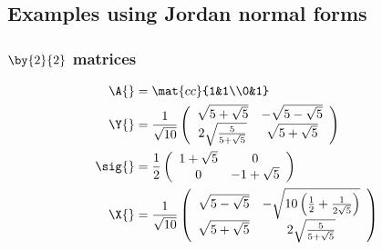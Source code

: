 \subsection[Jordan normal forms]{Examples using Jordan normal forms}

\subsubsection{$\by{2}{2}$ matrices}
\begin{equation}
  \begin{split}
  \A{} &= \mat{cc}{1&1\\0&1}\\
    \Y{} &= \frac{1}{\sqrt{10}}
    \left(
\begin{array}{cc}
 \sqrt{5+\sqrt{5}} & -\sqrt{5-\sqrt{5}} \\
 2 \sqrt{\frac{5}{5+\sqrt{5}}} & \sqrt{5+\sqrt{5}}
\end{array}
\right)\\
    \sig{}&=\frac{1}{2}
    \left(
\begin{array}{cc}
 1+\sqrt{5} & 0 \\
 0 & -1+\sqrt{5}
\end{array}
\right)\\
    \X{} &= \frac{1}{\sqrt{10}}
    \left(
\begin{array}{cc}
 \sqrt{5-\sqrt{5}} & -\sqrt{10 \left(\frac{1}{2}+\frac{1}{2 \sqrt{5}}\right)} \\
 \sqrt{5+\sqrt{5}} & 2 \sqrt{\frac{5}{5+\sqrt{5}}}
\end{array}
\right)
  \end{split}
\end{equation}

